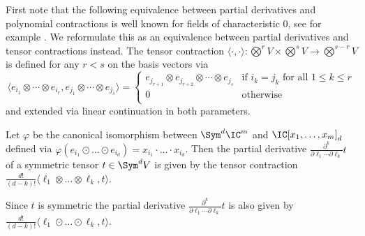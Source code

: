 First note that the following equivalence between partial derivatives and polynomial contractions is well known for fields of characteristic $0$, see for example \cite[Equation 1.1.2]{iarrobino1999power}.
We reformulate this as an equivalence between partial derivatives and tensor contractions instead. The tensor contraction $\langle \cdot, \cdot \rangle : \bigotimes^r V  \times \bigotimes^s V \to \bigotimes^{s-r} V$ is defined for any $r < s$ on the basis vectors via 
\[
    \langle e_{i_1} \otimes \cdots \otimes  e_{i_{r}}, e_{j_1} \otimes \cdots \otimes e_{j_{s}}\rangle = \begin{cases}
    e_{j_{r+1}} \otimes e_{j_{r+2}} \otimes \cdots \otimes e_{j_s} & \text{if $i_k = j_k$ for all $1 \leq k \leq r$}\\
    0 & \text{otherwise}\\
    \end{cases}
\]
and extended via linear continuation in both parameters.
\begin{lemma}
    \label{lem:derivativecontr}
    Let $\varphi$ be the canonical isomorphism between $\Sym^d \IC^m$ and $\IC[x_1,\ldots,x_m]_d$ defined via $\varphi\left(e_{i_1} \odot \dots \odot e_{i_d}\right) = x_{i_1} \cdot \dots \cdot x_{i_d}$.
    Then the partial derivative $\frac{\partial^k}{\partial\ell_1 \cdots \partial\ell_k}t$ of a symmetric tensor $t \in \Sym^d V$ is given by the tensor contraction $\frac{d!}{(d-k)!}\langle \ell_1 \otimes \dots \otimes \ell_k, t \rangle$.

    Since $t$ is symmetric the partial derivative $\frac{\partial^k}{\partial\ell_1 \cdots \partial\ell_k}t$ is also given by $\frac{d!}{(d-k)!} \langle \ell_1 \odot \dots \odot \ell_k, t \rangle$.
\end{lemma}
